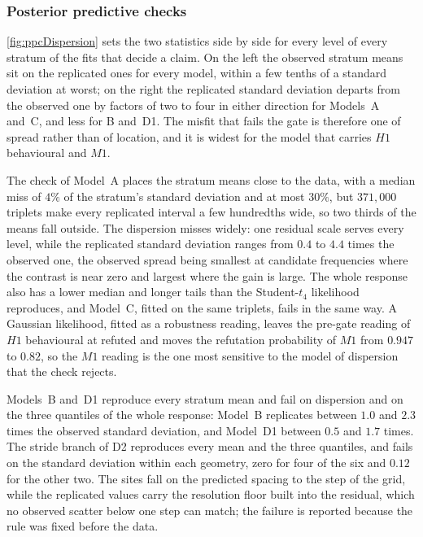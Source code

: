 \subsubsection{Posterior predictive checks}

\autoref{fig:ppcDispersion} sets the two statistics side by side for every level of every stratum of the fits that decide a claim. On the left the observed stratum means sit on the replicated ones for every model, within a few tenths of a standard deviation at worst; on the right the replicated standard deviation departs from the observed one by factors of two to four in either direction for Models~A and~C, and less for B and~D1. The misfit that fails the gate is therefore one of spread rather than of location, and it is widest for the model that carries $H1$ behavioural and $M1$.



The check of Model~A places the stratum means close to the data, with a median miss of $4\%$ of the stratum's standard deviation and at most $30\%$, but $371{,}000$ triplets make every replicated interval a few hundredths wide, so two thirds of the means fall outside. The dispersion misses widely: one residual scale serves every level, while the replicated standard deviation ranges from $0.4$ to $4.4$ times the observed one, the observed spread being smallest at candidate frequencies where the contrast is near zero and largest where the gain is large. The whole response also has a lower median and longer tails than the Student-$t_4$ likelihood reproduces, and Model~C, fitted on the same triplets, fails in the same way. A Gaussian likelihood, fitted as a robustness reading, leaves the pre-gate reading of $H1$ behavioural at refuted and moves the refutation probability of $M1$ from $0.947$ to $0.82$, so the $M1$ reading is the one most sensitive to the model of dispersion that the check rejects.

Models~B and~D1 reproduce every stratum mean and fail on dispersion and on the three quantiles of the whole response: Model~B replicates between $1.0$ and $2.3$ times the observed standard deviation, and Model~D1 between $0.5$ and $1.7$ times. The stride branch of D2 reproduces every mean and the three quantiles, and fails on the standard deviation within each geometry, zero for four of the six and $0.12$ for the other two. The sites fall on the predicted spacing to the step of the grid, while the replicated values carry the resolution floor built into the residual, which no observed scatter below one step can match; the failure is reported because the rule was fixed before the data.


